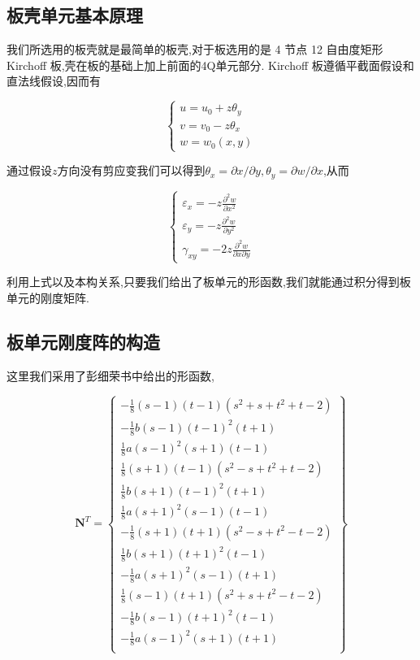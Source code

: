 
\subsection{板壳单元基本原理}
我们所选用的板壳就是最简单的板壳,对于板选用的是 4 节点 12 自由度矩形 Kirchoff 板,壳在板的基础上加上前面的4Q单元部分. Kirchoff 板遵循平截面假设和直法线假设,因而有

\[
\left\{ \begin{gathered}
u=u_0+z\theta_y \\
v=v_0-z\theta_x \\
w=w_0(x,y)
\end{gathered} \right.
\]

通过假设$z$方向没有剪应变我们可以得到$\theta_x=\partial x/\partial y, \theta_y=\partial w/\partial x$,从而

\[
\left\{ \begin{gathered}
\varepsilon_x = -z\frac{\partial^2 w}{\partial x^2} \\
\varepsilon_y = -z\frac{\partial^2 w}{\partial y^2} \\
\gamma_{xy} = -2z\frac{\partial^2 w}{\partial x \partial y}
\end{gathered} \right.
\]

利用上式以及本构关系,只要我们给出了板单元的形函数,我们就能通过积分得到板单元的刚度矩阵.

\subsection{板单元刚度阵的构造}

这里我们采用了彭细荣书中给出的形函数,

\[ \mathbf{N}^T=\left\{
\begin{array}{c}
-\frac{1}{8}(s-1)(t-1)(s^2+s+t^2+t-2)\\ -\frac{1}{8}b(s-1)(t-1)^2(t+1)\\ \frac{1}{8}a(s-1)^2(s+1)(t-1) \\
\frac{1}{8}(s+1)(t-1)(s^2-s+t^2+t-2) \\ \frac{1}{8}b(s+1)(t-1)^2(t+1) \\ \frac{1}{8}a(s+1)^2(s-1)(t-1) \\
-\frac{1}{8}(s+1)(t+1)(s^2-s+t^2-t-2)\\ \frac{1}{8}b(s+1)(t+1)^2(t-1) \\ -\frac{1}{8}a(s+1)^2(s-1)(t+1) \\
\frac{1}{8}(s-1)(t+1)(s^2+s+t^2-t-2) \\ -\frac{1}{8}b(s-1)(t+1)^2(t-1) \\ -\frac{1}{8}a(s-1)^2(s+1)(t+1) \\
\end{array} \right\} \]


